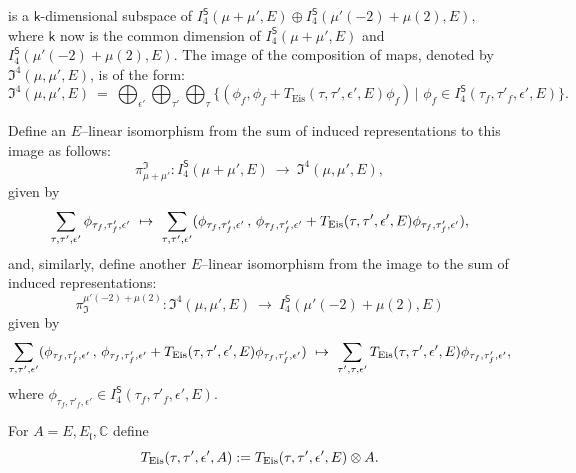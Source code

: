 \documentclass[11pt]{amsart}
\begin{document}
is a $\mathsf{k}$-dimensional subspace of $I_4^\mathsf{S}(\mu+\mu',E) \oplus I_4^{\mathsf{S}}(\mu'(-2)+\mu(2),E),$ where 
$\mathsf{k}$ now is the common dimension of $I_4^\mathsf{S}(\mu+\mu',E)$ and $I_4^{\mathsf{S}}(\mu'(-2)+\mu(2),E).$
The image of the composition of maps, denoted by $\mathfrak{I}^4(\mu,\mu',E)$, is of the form:
	\begin{equation*}
		\mathfrak{I}^4(\mu,\mu',E) \ = \ 
		\bigoplus_{\epsilon'}\bigoplus_{\tau'} \bigoplus_{\tau} 
		\{ (\phi_f, \phi_f  + T_{\text{Eis}}(\tau, \tau', \epsilon',E) \phi_f ) \,|\,\, \phi_f \in I_4^\mathsf{S}(\tau_f, \tau'_f, \epsilon',E)\}.
	\end{equation*}


\medskip
Define an $E$--linear isomorphism from the sum of induced representations to this image as follows:
$$		
\pi_{\mu+\mu'}^{\mathfrak{I}}: I_4^\mathsf{S}(\mu+\mu',E) \ \rightarrow \ \mathfrak{I}^4(\mu,\mu',E),
$$
given by 
$$
	\sum_{\tau,\tau', \epsilon'} \phi_{\tau_f,\tau'_f,\epsilon'} \ \mapsto \ 
	\sum_{\tau,\tau',\epsilon'} (\phi_{\tau_f,\tau'_f,\epsilon'}\,,\, \phi_{\tau_f,\tau'_f,\epsilon'} + 
		T_{\textup{Eis}}(\tau,\tau',\epsilon',E)\phi_{\tau_f,\tau'_f,\epsilon'}),
$$
and, similarly, define another $E$--linear isomorphism from the image to the sum of induced representations: 
$$
	\pi_{\mathfrak{I}}^{\mu'(-2)+\mu(2)}: \mathfrak{I}^4(\mu,\mu', E)  \ \rightarrow \ I_4^\mathsf{S}(\mu'(-2)+\mu(2),E)
$$
given by 
$$
\sum_{\tau,\tau',\epsilon'} (\phi_{\tau_f,\tau'_f,\epsilon'}\,,\, \phi_{\tau_f,\tau'_f,\epsilon'} + 
T_{\textup{Eis}}(\tau,\tau',\epsilon',E)\phi_{\tau_f,\tau'_f,\epsilon'}) \ \mapsto \ 
\sum_{\tau',\tau,\epsilon'} T_{\textup{Eis}}(\tau,\tau',\epsilon',E)\phi_{\tau_f,\tau'_f,\epsilon'},
$$
where $\phi_{\tau_f,\tau'_f,\epsilon'} \in I_4^\mathsf{S}(\tau_f, \tau'_f, \epsilon', E).$ 

\medskip

For $A = E, E_\mathfrak{l}, \mathbb{C}$ define
\begin{equation}
	T_{\textup{Eis}}(\tau,\tau',\epsilon',A) := T_{\textup{Eis}}(\tau,\tau',\epsilon',E)\otimes A.
\end{equation}
\end{document}
